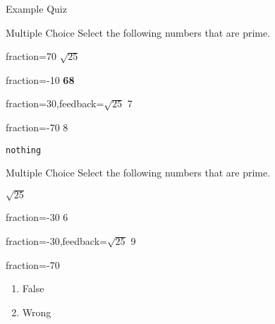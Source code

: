 \documentclass{article}
\begin{document}
\begin{quiz}{Example Quiz}
\begin{multi}[multiple,feedback={abc\\def $\sqrt{2}$}]{Multiple Choice}
Select the following numbers that are prime.
\item[fraction=70] $\sqrt{25}$
\item[fraction=-10] \textbf{68}
\item[fraction=30,feedback={$\sqrt{25}$}] 7
\item[fraction=-70] 8
\item \texttt{nothing}
\end{multi}

\begin{multi}[feedback={abc\\def $\sqrt{2}$}]{Multiple Choice}
Select the following numbers that are prime.
\item* $\sqrt{25}$
\item[fraction=-30] 6
\item[fraction=-30,feedback={$\sqrt{25}$}] 9
\item[fraction=-70] \begin{enumerate}
\item False
\item Wrong
\end{enumerate}
\end{multi}

\end{quiz}
\end{document}

